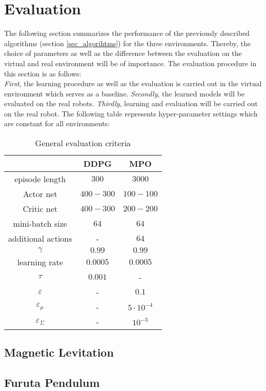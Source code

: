 \section{Evaluation}
The following section summarizes the performance of the previously described algorithms (section \ref{sec_algorihtms}) for the three environments. Thereby, the choice of parameters as well as the difference between the evaluation on the virtual and real environment will be of importance. The evaluation procedure in this section is as follows:\\
\textit{First}, the learning procedure as well as the evaluation is carried out in the virtual environment which serves as a baseline. \textit{Secondly}, the learned models will be evaluated on the real robots. \textit{Thirdly}, learning and evaluation will be carried out on the real robot.
The following table represents hyper-parameter settings which are constant for all environments:
\begin{table}
	\centering
	\caption{General evaluation criteria}
	\begin{tabular}{|c|c|c|}
		\hline
		&DDPG&MPO\\
		\hline
		episode length&$300$&$3000$\\
		\hline
		Actor net&$400-300$&$100 - 100$\\
		\hline
		Critic net&$400-300$&$200-200$\\
		\hline
		mini-batch size&$64$&$64$\\
		\hline
		additional actions&-&$64$\\
		\hline
		$\gamma$&$0.99$&$0.99$\\
		\hline
		learning rate&$0.0005$&$0.0005$\\
		\hline
		$\tau$&$0.001$&-\\
		\hline
		$\varepsilon$&-&$0.1$\\
		\hline
		$\varepsilon_\mu$&-&$5\cdot10^{-4}$\\
		\hline
		$\varepsilon_{\Sigma}$&-&$10^{-5}$\\
		\hline
	\end{tabular}
	\label{table_general_settings}
\end{table}
\subsection{Magnetic Levitation}
\subsection{Furuta Pendulum}
